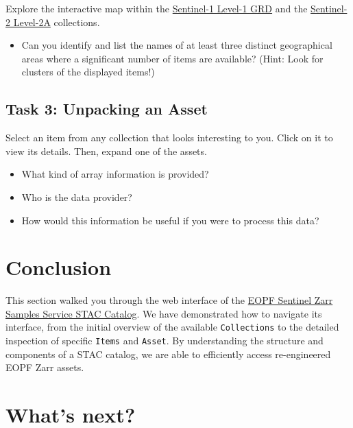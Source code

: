 \documentclass[
  letterpaper,
  DIV=11,
  numbers=noendperiod]{scrreprt}
\providecommand{\tightlist}{%
  \setlength{\itemsep}{0pt}\setlength{\parskip}{0pt}}
\begin{document}
Explore the interactive map within the
\href{https://stac.browser.user.eopf.eodc.eu/collections/sentinel-1-l1-grd?.itemFilterOpen=1&language=en}{Sentinel-1
Level-1 GRD} and the
\href{https://stac.browser.user.eopf.eodc.eu/collections/sentinel-2-l2a?.language=en}{Sentinel-2
Level-2A} collections.

\begin{itemize}
\tightlist
\item
  Can you identify and list the names of at least three distinct
  geographical areas where a significant number of items are available?
  (Hint: Look for clusters of the displayed items!)
\end{itemize}

\subsection{Task 3: Unpacking an Asset}\label{task-3-unpacking-an-asset}

Select an item from any collection that looks interesting to you. Click
on it to view its details. Then, expand one of the assets.

\begin{itemize}
\tightlist
\item
  What kind of array information is provided?
\item
  Who is the data provider?
\item
  How would this information be useful if you were to process this data?
\end{itemize}

\section{Conclusion}\label{conclusion-6}

This section walked you through the web interface of the
\href{https://stac.browser.user.eopf.eodc.eu/?.language=en}{EOPF
Sentinel Zarr Samples Service STAC Catalog}. We have demonstrated how to
navigate its interface, from the initial overview of the available
\texttt{Collections} to the detailed inspection of specific
\texttt{Items} and \texttt{Asset}. By understanding the structure and
components of a STAC catalog, we are able to efficiently access
re-engineered EOPF Zarr assets.

\section{What's next?}\label{whats-next-6}
\end{document}
